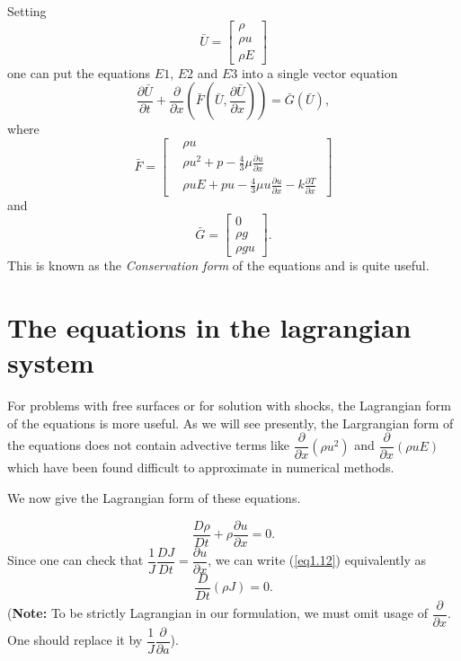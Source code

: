 \begin{remark}\label{chap1:rem1.2}
Setting
$$
\bar{U} = 
\begin{bmatrix}
\rho\\\rho u\\ \rho E
\end{bmatrix}
$$
one can put the equations $E1$, $E2$ and $E3$ into a single vector
equation
\begin{equation*}
\frac{\partial \bar{U}}{\partial t} + \frac{\partial}{\partial x}
\left(\bar{F} \left(\bar{U}, \frac{\partial \bar{U}}{\partial
  x}\right)\right) = \bar{G} 
(\bar{U}), \tag{1.11}\label{eq1.11}
\end{equation*}
where 
$$
\bar{F} = \left[
\begin{aligned}
&  \rho u \; \\
& \rho u^2 + p - \frac{4}{3} \mu \frac{\partial u}{\partial x} \; \\
& \rho uE + pu - \frac{4}{3} \mu u \frac{\partial u}{\partial x} - k
\frac{\partial T}{\partial x} \; 
\end{aligned} \right]
$$
and
$$
\bar{G} = 
\begin{bmatrix}
0\\
\rho g\\
\rho g u
\end{bmatrix} .
$$\pageoriginale 
This is known as the {\em Conservation form} of the equations and is
quite useful.
\end{remark}

\section{The equations in the lagrangian system}\label{chap1:sec1.5}

For problems with free surfaces or for solution with shocks, the
Lagrangian form of the equations is more useful. As we will see
presently, the Largrangian form of the equations does not contain
advective terms like $\dfrac{\partial}{\partial x} (\rho u^2)$ and
$\dfrac{\partial}{\partial x} (\rho u E)$ which have been found
difficult to approximate in numerical methods.

We now give the Lagrangian form of these equations.

\medskip
{}
\begin{equation*}
\frac{D\rho}{Dt} + \rho \frac{\partial u}{\partial x} = 0 .
 \tag{1.12}\label{eq1.12}
\end{equation*}
Since one can check that $\dfrac{1}{J} \dfrac{DJ}{Dt} =
\dfrac{\partial u}{\partial x}$, we can write (\ref{eq1.12}) equivalently as
\begin{equation*}
\dfrac{D}{Dt} (\rho J) = 0. \tag*{(1.12$'$)}\label{eq1.12'}
\end{equation*}
({\bf Note:} To be strictly Lagrangian in our formulation, we must
omit usage of $\dfrac{\partial}{\partial x}$. One should replace it by
$\dfrac{1}{J} \dfrac{\partial}{\partial a}$). 

